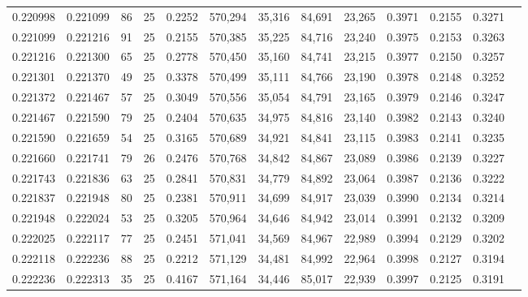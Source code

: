 \begin{tabular}{rrrrrrrrrrrrr}
0.220998 & 0.221099 &    86 &  25 &                                     0.2252 & 570,294 &  35,316 &  84,691 &  23,265 & 0.3971 & 0.2155 & 0.3271 \\
0.221099 & 0.221216 &    91 &  25 &                                     0.2155 & 570,385 &  35,225 &  84,716 &  23,240 & 0.3975 & 0.2153 & 0.3263 \\
0.221216 & 0.221300 &    65 &  25 &                                     0.2778 & 570,450 &  35,160 &  84,741 &  23,215 & 0.3977 & 0.2150 & 0.3257 \\
0.221301 & 0.221370 &    49 &  25 &                                     0.3378 & 570,499 &  35,111 &  84,766 &  23,190 & 0.3978 & 0.2148 & 0.3252 \\
0.221372 & 0.221467 &    57 &  25 &                                     0.3049 & 570,556 &  35,054 &  84,791 &  23,165 & 0.3979 & 0.2146 & 0.3247 \\
0.221467 & 0.221590 &    79 &  25 &                                     0.2404 & 570,635 &  34,975 &  84,816 &  23,140 & 0.3982 & 0.2143 & 0.3240 \\
0.221590 & 0.221659 &    54 &  25 &                                     0.3165 & 570,689 &  34,921 &  84,841 &  23,115 & 0.3983 & 0.2141 & 0.3235 \\
0.221660 & 0.221741 &    79 &  26 &                                     0.2476 & 570,768 &  34,842 &  84,867 &  23,089 & 0.3986 & 0.2139 & 0.3227 \\
0.221743 & 0.221836 &    63 &  25 &                                     0.2841 & 570,831 &  34,779 &  84,892 &  23,064 & 0.3987 & 0.2136 & 0.3222 \\
0.221837 & 0.221948 &    80 &  25 &                                     0.2381 & 570,911 &  34,699 &  84,917 &  23,039 & 0.3990 & 0.2134 & 0.3214 \\
0.221948 & 0.222024 &    53 &  25 &                                     0.3205 & 570,964 &  34,646 &  84,942 &  23,014 & 0.3991 & 0.2132 & 0.3209 \\
0.222025 & 0.222117 &    77 &  25 &                                     0.2451 & 571,041 &  34,569 &  84,967 &  22,989 & 0.3994 & 0.2129 & 0.3202 \\
0.222118 & 0.222236 &    88 &  25 &                                     0.2212 & 571,129 &  34,481 &  84,992 &  22,964 & 0.3998 & 0.2127 & 0.3194 \\
0.222236 & 0.222313 &    35 &  25 &                                     0.4167 & 571,164 &  34,446 &  85,017 &  22,939 & 0.3997 & 0.2125 & 0.3191 \\

\end{tabular}
